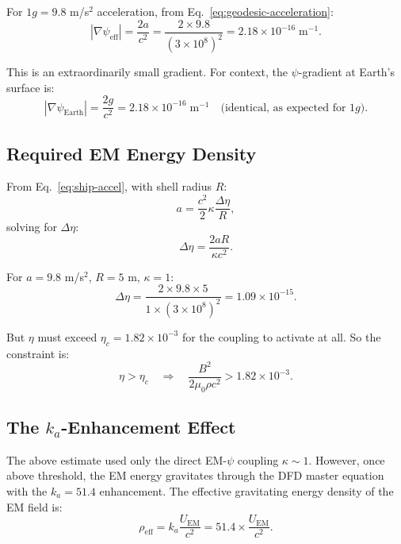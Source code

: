 \documentclass[12pt, letterpaper]{article}
\theoremstyle{definition}
\theoremstyle{remark}
\newcommand{\ka}{k_a}
\newcommand{\etac}{\eta_c}
\begin{document}
For $1g = 9.8$ m/s$^2$ acceleration, from Eq.~\eqref{eq:geodesic-acceleration}:
\begin{equation}
|\nabla \psi_{\mathrm{eff}}| = \frac{2a}{c^2}
= \frac{2 \times 9.8}{(3 \times 10^8)^2}
= 2.18 \times 10^{-16} \; \mathrm{m}^{-1}.
\label{eq:grad-psi-1g}
\end{equation}

This is an extraordinarily small gradient. For context, the $\psi$-gradient
at Earth's surface is:
\begin{equation}
|\nabla\psi_{\mathrm{Earth}}| = \frac{2g}{c^2}
= 2.18 \times 10^{-16} \; \mathrm{m}^{-1}
\quad \text{(identical, as expected for $1g$)}.
\end{equation}

\subsection{Required EM Energy Density}

From Eq.~\eqref{eq:ship-accel}, with shell radius $R$:
\begin{equation}
a = \frac{c^2}{2} \kappa \frac{\Delta\eta}{R},
\end{equation}
solving for $\Delta\eta$:
\begin{equation}
\Delta\eta = \frac{2aR}{\kappa c^2}.
\end{equation}

For $a = 9.8$ m/s$^2$, $R = 5$ m, $\kappa = 1$:
\begin{equation}
\Delta\eta = \frac{2 \times 9.8 \times 5}{1 \times (3 \times 10^8)^2}
= 1.09 \times 10^{-15}.
\end{equation}

But $\eta$ must exceed $\etac = 1.82 \times 10^{-3}$ for the coupling to
activate at all. So the constraint is:
\begin{equation}
\eta > \etac \quad \Rightarrow \quad
\frac{B^2}{2\mu_0 \rho c^2} > 1.82 \times 10^{-3}.
\end{equation}

\subsection{The $\ka$-Enhancement Effect}

The above estimate used only the direct EM-$\psi$ coupling $\kappa \sim 1$.
However, once above threshold, the EM energy gravitates through the DFD
master equation with the $\ka = 51.4$ enhancement. The effective gravitating
energy density of the EM field is:
\begin{equation}
\rho_{\mathrm{eff}} = \ka \frac{U_{\mathrm{EM}}}{c^2}
= 51.4 \times \frac{U_{\mathrm{EM}}}{c^2}.
\end{equation}
\end{document}
